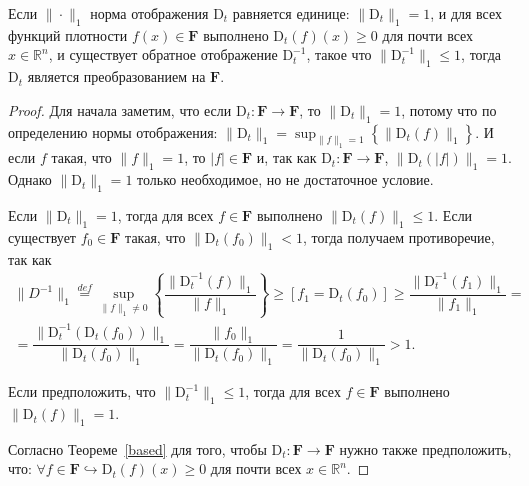        \begin{theorem} \label{R_to_R}
            Если $\| \cdot \|_1$ норма отображения $\text{D}_t$ равняется единице: $\| \text{D}_t \|_1 = 1$, и для всех функций плотности $f(x) \in \textbf{F}$ выполнено $\text{D}_t(f)(x) \geq 0$ для почти всех $x \in \mathbb{R}^n$, и существует обратное отображение $\text{D}_t^{-1}$, такое что $\|\text{D}_t^{-1}\|_1 \leq 1$, тогда $\text{D}_t$ является преобразованием на $\textbf{F}$.
        \end{theorem}
        \begin{proof}
             Для начала заметим, что если $\text{D}_t: \textbf{F} \to \textbf{F}$, то $\|\text{D}_t\|_1 = 1$, потому что по определению нормы отображения:
            $
                \|\text{D}_t\|_1 = \sup_{\|f\|_1 = 1}\left\{\|\text{D}_t(f)\|_1\right\}.
            $
            И если $f$ такая, что $\|f\|_1 = 1$, то $|f| \in \textbf{F}$ и, так как $\text{D}_t: \textbf{F} \to \textbf{F}$, $\|\text{D}_t(|f|)\|_1 = 1$. Однако $\|\text{D}_t\|_1 = 1$ только необходимое, но не достаточное условие.
    
            Если $\|\text{D}_t\|_1 = 1$, тогда для всех $f \in \textbf{F}$ выполнено $\|\text{D}_t(f)\|_1 \leq 1$. Если существует $f_0 \in \textbf{F}$ такая, что $\|\text{D}_t(f_0)\|_1 < 1$, тогда получаем противоречие, так как
            \begin{multline*}
                \|D^{-1}\|_1 \overset{def}{=} \underset{\|f\|_1 \neq 0}{\sup}\left\{\dfrac{\|\text{D}_t^{-1}(f)\|_1}{\|f\|_1}\right\} 
                \geq \left[f_1 = \text{D}_t(f_0)\right] \geq
                \dfrac{\|\text{D}_t^{-1}(f_1)\|_1}{\|f_1\|_1} = \\ = 
                \dfrac{\|\text{D}_t^{-1}(\text{D}_t(f_0))\|_1}{\|\text{D}_t(f_0)\|_1} = 
                \dfrac{\|f_0\|_1}{\|\text{D}_t(f_0)\|_1} = \dfrac{1}{\|\text{D}_t(f_0)\|_1} > 1.
            \end{multline*}

            Если предположить, что $\|\text{D}_t^{-1}\|_1 \leq 1$, тогда для всех $f \in \textbf{F}$ выполнено $\|\text{D}_t(f)\|_1 = 1$.
    
            Согласно Теореме~\ref{based} для того, чтобы $\text{D}_t : \textbf{F} \to \textbf{F}$ нужно также предположить, что: $\forall f \in \textbf{F} \hookrightarrow \text{D}_t(f)(x) \geq 0$ для почти всех $x \in \mathbb{R}^n$.
        \end{proof}

